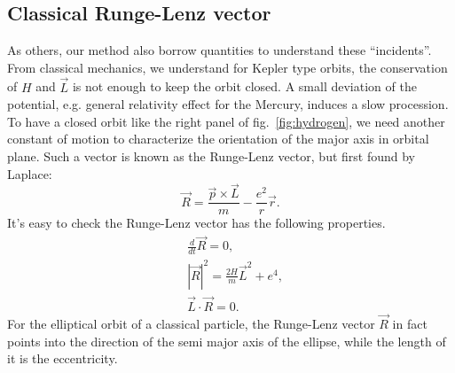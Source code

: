 \documentclass[a4paper,11pt]{article}
\theoremstyle{remark}
\theoremstyle{defn}
\begin{document}
\subsection{Classical Runge-Lenz vector}
As others, our method also borrow quantities to understand these ``incidents''. From classical mechanics, we understand for 
Kepler type orbits, the conservation of $H$ and $\vec{L}$ is not enough to keep the orbit closed. 
A small deviation of the potential, e.g. general relativity effect for the Mercury, induces a slow procession. 
To have a closed orbit like the right panel of fig.~\ref{fig:hydrogen}, we need another constant of motion to characterize 
the orientation of the major axis in orbital plane. Such a vector is known as the Runge-Lenz vector, but first found by Laplace:
\begin{equation}
\vec{R} = \frac{\vec{p}\times\vec{L}}{m}-\frac{e^2}{r}\vec{r}. 
\end{equation}
It's easy to check the Runge-Lenz vector has the following properties.
\begin{align}
&\frac{d}{dt}\vec{R} = 0, \label{eq:pp1} \\
&|\vec{R}|^2 = \frac{2H}{m}\vec{L}^2+e^4, \label{eq:pp2} \\
&\vec{L}\cdot\vec{R} = 0. \label{eq:pp3}
\end{align}
For the elliptical orbit of a classical particle, the Runge-Lenz vector $\vec{R}$ in fact points
into the direction of the semi major axis of the ellipse, while the length of it is the eccentricity.
\end{document}
